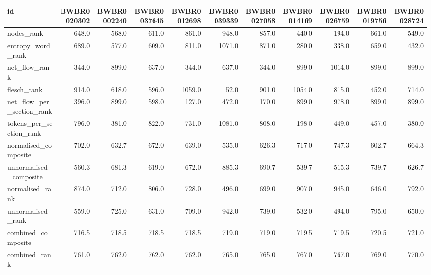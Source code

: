 \begin{tabular}{lrrrrrrrrrr}
\toprule
id & BWBR0020302 & BWBR0002240 & BWBR0037645 & BWBR0012698 & BWBR0039339 & BWBR0027058 & BWBR0014169 & BWBR0026759 & BWBR0019756 & BWBR0028724 \\
\midrule
nodes\_rank & 648.0 & 568.0 & 611.0 & 861.0 & 948.0 & 857.0 & 440.0 & 194.0 & 661.0 & 549.0 \\
\cline{1-11}
entropy\_word\_rank & 689.0 & 577.0 & 609.0 & 811.0 & 1071.0 & 871.0 & 280.0 & 338.0 & 659.0 & 432.0 \\
\cline{1-11}
net\_flow\_rank & 344.0 & 899.0 & 637.0 & 344.0 & 637.0 & 344.0 & 899.0 & 1014.0 & 899.0 & 899.0 \\
\cline{1-11}
flesch\_rank & 914.0 & 618.0 & 596.0 & 1059.0 & 52.0 & 901.0 & 1054.0 & 815.0 & 452.0 & 714.0 \\
\cline{1-11}
net\_flow\_per\_section\_rank & 396.0 & 899.0 & 598.0 & 127.0 & 472.0 & 170.0 & 899.0 & 978.0 & 899.0 & 899.0 \\
\cline{1-11}
tokens\_per\_section\_rank & 796.0 & 381.0 & 822.0 & 731.0 & 1081.0 & 808.0 & 198.0 & 449.0 & 457.0 & 380.0 \\
\cline{1-11}
normalised\_composite & 702.0 & 632.7 & 672.0 & 639.0 & 535.0 & 626.3 & 717.0 & 747.3 & 602.7 & 664.3 \\
\cline{1-11}
unnormalised\_composite & 560.3 & 681.3 & 619.0 & 672.0 & 885.3 & 690.7 & 539.7 & 515.3 & 739.7 & 626.7 \\
\cline{1-11}
normalised\_rank & 874.0 & 712.0 & 806.0 & 728.0 & 496.0 & 699.0 & 907.0 & 945.0 & 646.0 & 792.0 \\
\cline{1-11}
unnormalised\_rank & 559.0 & 725.0 & 631.0 & 709.0 & 942.0 & 739.0 & 532.0 & 494.0 & 795.0 & 650.0 \\
\cline{1-11}
combined\_composite & 716.5 & 718.5 & 718.5 & 718.5 & 719.0 & 719.0 & 719.5 & 719.5 & 720.5 & 721.0 \\
\cline{1-11}
combined\_rank & 761.0 & 762.0 & 762.0 & 762.0 & 765.0 & 765.0 & 767.0 & 767.0 & 769.0 & 770.0 \\
\cline{1-11}
\bottomrule
\end{tabular}
